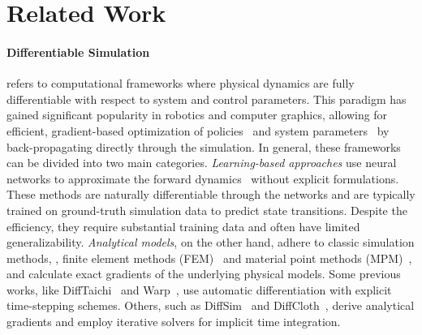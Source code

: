 \section{Related Work}

\paragraph{Differentiable Simulation} refers to computational frameworks where physical dynamics are fully differentiable with respect to system and control parameters. This paradigm has gained significant popularity in robotics and computer graphics, allowing for efficient, gradient-based optimization of policies~\citep{mora2021pods,huangplasticinelab,xuaccelerated,xianfluidlab,wangthin} and system parameters~\citep{pacnerf,xue20243d,ma2023learning,cao2024neuma,linomniphysgs} by back-propagating directly through the simulation. In general, these frameworks can be divided into two main categories. 
\emph{Learning-based approaches} use neural networks to approximate the forward dynamics~\citep{sanchez2020learning,pfaff2020learning,chendifferentiable} without explicit formulations. These methods are naturally differentiable through the networks and are typically trained on ground-truth simulation data to predict state transitions. Despite the efficiency, they require substantial training data and often have limited generalizability.
\emph{Analytical models}, on the other hand, adhere to classic simulation methods, \eg, finite element methods (FEM)~\citep{sifakis2012fem} and material point methods (MPM)~\citep{jiang2016material}, and calculate exact gradients of the underlying physical models. Some previous works, like DiffTaichi~\citep{hu2020difftaichi} and Warp~\citep{warp2022}, use automatic differentiation with explicit time-stepping schemes. Others, such as DiffSim~\citep{qiao2020scalable} and DiffCloth~\citep{li2022diffcloth}, derive analytical gradients and employ iterative solvers for implicit time integration. 

